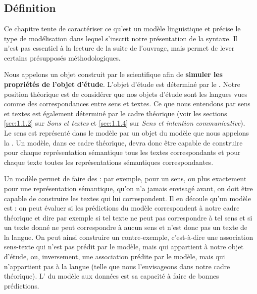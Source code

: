 \chapter{}\label{sec:1.3}

\section{Définition}\label{sec:1.3.0}

Ce chapitre tente de caractériser ce qu’est un modèle linguistique et précise le type de modélisation dans lequel s’inscrit notre présentation de la syntaxe. Il n’est pas essentiel à la lecture de la suite de l’ouvrage, mais permet de lever certains présupposés méthodologiques.

Nous appelons  un objet construit par le scientifique afin de \textbf{simuler les propriétés de l’objet} \textbf{d’étude}. L’objet d’étude est déterminé par le . Notre position théorique est de considérer que nos objets d’étude sont les langues vues comme des correspondances entre sens et textes. Ce que nous entendons par sens et textes est également déterminé par le cadre théorique (voir les sections \ref{sec:1.1.2} sur \textit{Sons et textes} et \ref{sec:1.1.4} sur \textit{Sens et intention communicative}). Le sens est représenté dans le modèle par un objet du modèle que nous appelons la . Un modèle, dans ce cadre théorique, devra donc être capable de construire pour chaque représentation sémantique tous les textes correspondants et pour chaque texte toutes les représentations sémantiques correspondantes.

Un modèle permet de faire des : par exemple, pour un sens, ou plus exactement pour une représentation sémantique, qu’on n’a jamais envisagé avant, on doit être capable de construire les textes qui lui correspondent. Il en découle qu’un modèle est  : on peut évaluer si les prédictions du modèle correspondent à notre cadre théorique et dire par exemple si tel texte ne peut pas correspondre à tel sens et si un texte donné ne peut correspondre à aucun sens et n’est donc pas un texte de la langue. On peut ainsi construire un contre-exemple, c’est-à-dire une association sens-texte qui n’est pas prédit par le modèle, mais qui appartient à notre objet d’étude, ou, inversement, une association prédite par le modèle, mais qui n’appartient pas à la langue (telle que nous l’envisageons dans notre cadre théorique). L’ du modèle aux données est sa capacité à faire de bonnes prédictions.

